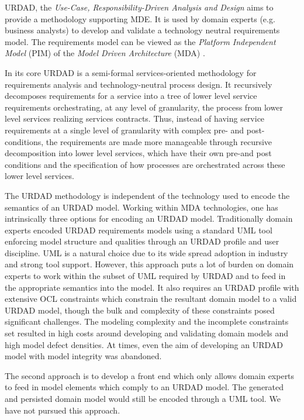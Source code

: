 URDAD, the {\em Use-Case, Responsibility-Driven Analysis and Design} \cite{solms_technology_2007} aims to provide a methodology supporting MDE. It is used by domain experts (e.g. business analysts) to develop and validate a technology neutral requirements model. The requirements model can be viewed as the {\em Platform Independent Model} (PIM) of the {\em Model Driven Architecture} (MDA) \cite{solms_urdad_2010}.

In its core URDAD is a semi-formal services-oriented methodology for requirements analysis and technology-neutral process design. It recursively decomposes requirements for a service into a tree of lower level service requirements orchestrating, at any level of granularity, the process from lower level services realizing services contracts. Thus, instead of having service requirements at a single level of granularity with complex pre- and post-conditions, the requirements are made more manageable through recursive decomposition into lower level services, which have their own pre-and post conditions and the specification of how processes are orchestrated across these lower level services. 

The URDAD methodology is independent of the technology used to encode the semantics of an URDAD model. Working within MDA technologies, one has intrinsically three options for encoding an URDAD model. Traditionally domain experts encoded URDAD requirements models using a standard UML tool enforcing model structure and qualities through an URDAD profile and user discipline. UML is a natural choice due to its wide spread adoption in industry and strong tool support. However, this approach puts a lot of burden on domain experts to work within the subset of UML required by URDAD and to feed in the appropriate semantics into the model. It also requires an URDAD profile with extensive OCL constraints which constrain the resultant domain model to a valid URDAD model, though the bulk and complexity of these constraints posed significant challenges. The modeling complexity and the incomplete constraints set resulted in high costs around developing and validating domain models and high model defect densities. At times, even the aim of developing an URDAD model with model integrity was abandoned.

The second approach is to develop a front end which only allows domain experts to feed in model elements which comply to an URDAD model. The generated and persisted domain model would still be encoded through a UML tool. We have not pursued this approach.


